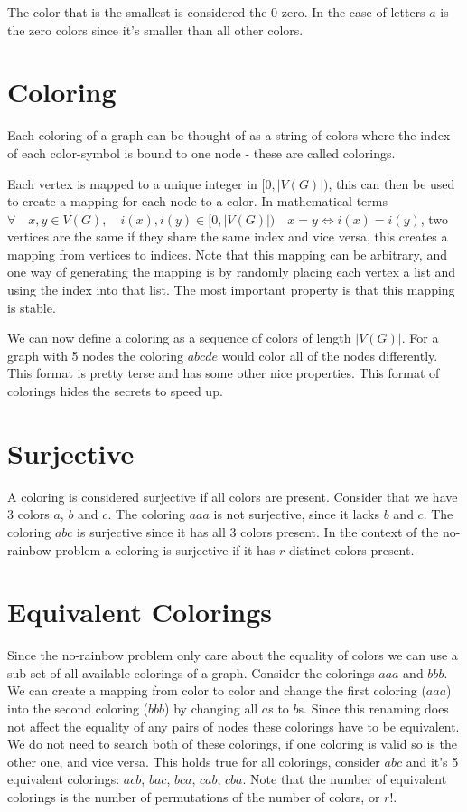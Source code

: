 \documentclass{book}
\begin{document}
The color that is the smallest is considered the 0-zero. In the case of letters $a$ is the zero colors since it's smaller than all other colors.

\section{Coloring}
Each coloring of a graph can be thought of as a string of colors where the index of each color-symbol is bound to one node - these are called colorings.

Each vertex is mapped to a unique integer in $[0, |V(G)|)$, this can then be used to create a mapping for each node to a color. In mathematical terms $\forall \quad x, y \in V(G), \quad i(x), i(y) \in [0, |V(G)|) \quad x = y \iff i(x) = i(y)$, two vertices are the same if they share the same index and vice versa, this creates a mapping from vertices to indices. Note that this mapping can be arbitrary, and one way of generating the mapping is by randomly placing each vertex a list and using the index into that list. The most important property is that this mapping is stable.

We can now define a coloring as a sequence of colors of length $|V(G)|$. For a graph with 5 nodes the coloring $abcde$ would color all of the nodes differently. This format is pretty terse and has some other nice properties. This format of colorings hides the secrets to speed up.

\section{Surjective}
A coloring is considered surjective if all colors are present. Consider that we have 3 colors $a$, $b$ and $c$. The coloring $aaa$ is not surjective, since it lacks $b$ and $c$. The coloring $abc$ is surjective since it has all 3 colors present. In the context of the no-rainbow problem a coloring is surjective if it has $r$ distinct colors present.

\section{Equivalent Colorings}
Since the no-rainbow problem only care about the equality of colors we can use a sub-set of all available colorings of a graph. Consider the colorings $aaa$ and $bbb$. We can create a mapping from color to color and change the first coloring ($aaa$) into the second coloring ($bbb$) by changing all $a$s to $b$s. Since this renaming does not affect the equality of any pairs of nodes these colorings have to be equivalent. We do not need to search both of these colorings, if one coloring is valid so is the other one, and vice versa. This holds true for all colorings, consider $abc$ and it's 5 equivalent colorings: $acb$, $bac$, $bca$, $cab$, $cba$. Note that the number of equivalent colorings is the number of permutations of the number of colors, or $r!$.
\end{document}
